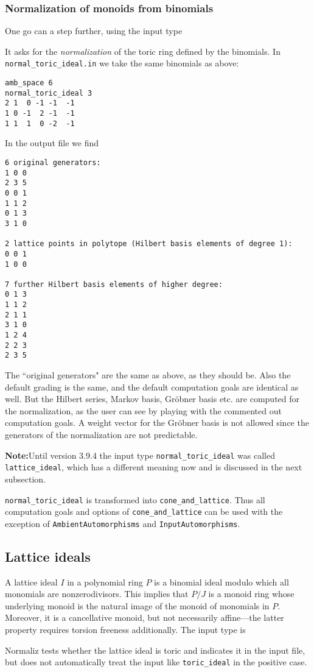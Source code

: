 \subsubsection{Normalization of monoids from binomials}\label{normal_toric_ideal}

One go can a step further, using the input type
\begin{itemize}
\end{itemize}
It asks for the \emph{normalization} of the toric ring defined by the binomials. In \verb|normal_toric_ideal.in| we take the same binomials  as above:
\begin{Verbatim}
amb_space 6
normal_toric_ideal 3
2 1  0 -1 -1  -1
1 0 -1  2 -1  -1
1 1  1  0 -2  -1
\end{Verbatim}
In the output file we find
\begin{Verbatim}
6 original generators:
1 0 0
2 3 5
0 0 1
1 1 2
0 1 3
3 1 0

2 lattice points in polytope (Hilbert basis elements of degree 1):
0 0 1
1 0 0

7 further Hilbert basis elements of higher degree:
0 1 3
1 1 2
2 1 1
3 1 0
1 2 4
2 2 3
2 3 5
\end{Verbatim}
The ``original generators" are the same as above, as they should be. Also the default grading is the same, and the default computation goals are identical as well. But the Hilbert series, Markov basis, Gröbner basis etc. are computed for the normalization, as the user can see by playing with the commented out computation goals. A weight vector for the Gröbner basis is not allowed since the generators of the normalization are not predictable.

\textbf{Note:}\enspace Until version 3.9.4 the input type \verb|normal_toric_ideal| was called \verb|lattice_ideal|, which has a different meaning now and is discussed in the next subsection.

\verb|normal_toric_ideal| is transformed into \verb|cone_and_lattice|. Thus all computation goals and options of \verb|cone_and_lattice| can be used with the exception of \verb|AmbientAutomorphisms| and \verb|InputAutomorphisms|.

\subsection{Lattice ideals}\label{lattice_ideal}

A lattice ideal $I$ in a polynomial ring $P$ is a binomial ideal modulo which all monomials are nonzerodivisors. This implies that $P/J$ is a monoid ring whose underlying monoid is the natural image of the monoid of monomials in $P$. Moreover, it is a cancellative monoid, but not necessarily affine---the latter property requires torsion freeness additionally. The input type is
\begin{itemize}
\end{itemize}
Normaliz tests whether the lattice ideal is toric and indicates it in the input file, but does not automatically treat the input like \verb|toric_ideal| in the positive case.


